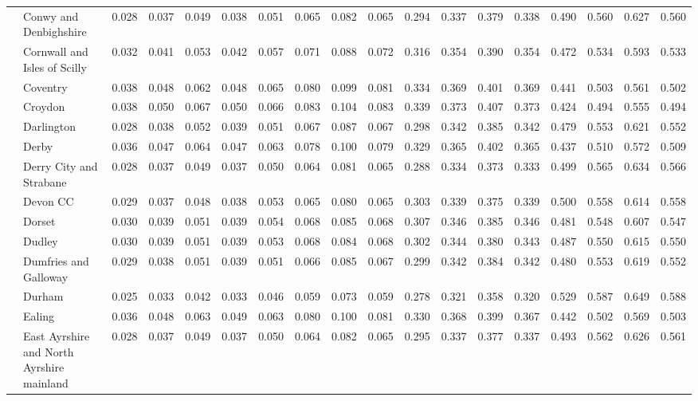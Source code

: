 \begin{tabular}{llrrrrrrrrrrrrrrrr}
 & Conwy and Denbighshire & 0.028 & 0.037 & 0.049 & 0.038 & 0.051 & 0.065 & 0.082 & 0.065 & 0.294 & 0.337 & 0.379 & 0.338 & 0.490 & 0.560 & 0.627 & 0.560 \\
 & Cornwall and Isles of Scilly & 0.032 & 0.041 & 0.053 & 0.042 & 0.057 & 0.071 & 0.088 & 0.072 & 0.316 & 0.354 & 0.390 & 0.354 & 0.472 & 0.534 & 0.593 & 0.533 \\
 & Coventry & 0.038 & 0.048 & 0.062 & 0.048 & 0.065 & 0.080 & 0.099 & 0.081 & 0.334 & 0.369 & 0.401 & 0.369 & 0.441 & 0.503 & 0.561 & 0.502 \\
 & Croydon & 0.038 & 0.050 & 0.067 & 0.050 & 0.066 & 0.083 & 0.104 & 0.083 & 0.339 & 0.373 & 0.407 & 0.373 & 0.424 & 0.494 & 0.555 & 0.494 \\
 & Darlington & 0.028 & 0.038 & 0.052 & 0.039 & 0.051 & 0.067 & 0.087 & 0.067 & 0.298 & 0.342 & 0.385 & 0.342 & 0.479 & 0.553 & 0.621 & 0.552 \\
 & Derby & 0.036 & 0.047 & 0.064 & 0.047 & 0.063 & 0.078 & 0.100 & 0.079 & 0.329 & 0.365 & 0.402 & 0.365 & 0.437 & 0.510 & 0.572 & 0.509 \\
 & Derry City and Strabane & 0.028 & 0.037 & 0.049 & 0.037 & 0.050 & 0.064 & 0.081 & 0.065 & 0.288 & 0.334 & 0.373 & 0.333 & 0.499 & 0.565 & 0.634 & 0.566 \\
 & Devon CC & 0.029 & 0.037 & 0.048 & 0.038 & 0.053 & 0.065 & 0.080 & 0.065 & 0.303 & 0.339 & 0.375 & 0.339 & 0.500 & 0.558 & 0.614 & 0.558 \\
 & Dorset & 0.030 & 0.039 & 0.051 & 0.039 & 0.054 & 0.068 & 0.085 & 0.068 & 0.307 & 0.346 & 0.385 & 0.346 & 0.481 & 0.548 & 0.607 & 0.547 \\
 & Dudley & 0.030 & 0.039 & 0.051 & 0.039 & 0.053 & 0.068 & 0.084 & 0.068 & 0.302 & 0.344 & 0.380 & 0.343 & 0.487 & 0.550 & 0.615 & 0.550 \\
 & Dumfries and Galloway & 0.029 & 0.038 & 0.051 & 0.039 & 0.051 & 0.066 & 0.085 & 0.067 & 0.299 & 0.342 & 0.384 & 0.342 & 0.480 & 0.553 & 0.619 & 0.552 \\
 & Durham & 0.025 & 0.033 & 0.042 & 0.033 & 0.046 & 0.059 & 0.073 & 0.059 & 0.278 & 0.321 & 0.358 & 0.320 & 0.529 & 0.587 & 0.649 & 0.588 \\
 & Ealing & 0.036 & 0.048 & 0.063 & 0.049 & 0.063 & 0.080 & 0.100 & 0.081 & 0.330 & 0.368 & 0.399 & 0.367 & 0.442 & 0.502 & 0.569 & 0.503 \\
 & East Ayrshire and North Ayrshire mainland & 0.028 & 0.037 & 0.049 & 0.037 & 0.050 & 0.064 & 0.082 & 0.065 & 0.295 & 0.337 & 0.377 & 0.337 & 0.493 & 0.562 & 0.626 & 0.561 \\

\end{tabular}
